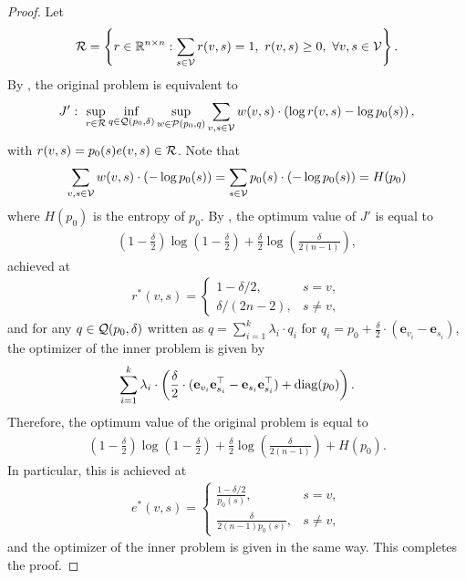 \begin{proof}
Let 
\begin{align*}
    \mathcal{R} = \left\{r \in \mathbb{R}^{n \times n}: \sum_{s \in \mathcal{V}} r(v,s) = 1, ~r(v,s) \geq 0,~ \forall v,s \in \mathcal{V} \right\}.
\end{align*}
By , the original problem is equivalent to
\begin{align*}
    J': ~\sup_{r \in \mathcal{R}} \inf_{q \in \mathcal{Q}(p_0,\delta)} \sup_{w \in \mathcal{P}(p_0,q)} \sum_{v,s \in \mathcal{V}} w(v,s) \cdot \left(\log r(v,s) - \log p_0(s)\right),
\end{align*}
with $r(v,s) = {p_0(s)e(v,s)} \in \mathcal{R}$.
Note that 
\begin{align*}
    \sum_{v,s \in \mathcal{V}} w(v,s) \cdot (- \log p_0(s)) = \sum_{s \in \mathcal{V}} p_0(s) \cdot (- \log p_0(s)) = H(p_0)
\end{align*}
where $H(p_0)$ is the entropy of $p_0$. 
By , the optimum value of $J'$ is equal to 
\begin{align*}
(1-\tfrac{\delta}{2})\log\left(1-\frac{\delta}{2}\right)
 + \tfrac{\delta}{2}\log\left(\frac{\delta}{2(n-1)}\right),
\end{align*}
achieved at
\begin{align*}
r^*(v,s)
=
\begin{cases}
1-\delta/2, & s=v,\\
\delta/(2n-2), & s\neq v,
\end{cases}
\end{align*}
and for any $q \in \mathcal{Q}(p_0,\delta)$ written as $q = \sum_{i=1}^k \lambda_i \cdot q_i$ for $q_i = p_0 + \frac{\delta}{2}\cdot (\mathbf{e}_{v_i} - \mathbf{e}_{s_i}) $, the optimizer of the inner problem is given by
\begin{align*}
    \sum_{i=1}^k \lambda_i \cdot \left(\frac{\delta}{2} \cdot (\mathbf{e}_{v_i}\mathbf{e}_{s_i}^\top - \mathbf{e}_{s_i}\mathbf{e}_{s_i}^\top) + \mathrm{diag}(p_0)\right).
\end{align*}
Therefore, the optimum value of the original problem is equal to
\begin{align*}
(1-\tfrac{\delta}{2})\log\left(1-\frac{\delta}{2}\right)
 + \tfrac{\delta}{2}\log\left(\frac{\delta}{2(n-1)}\right) + H(p_0).
\end{align*}
In particular, this is achieved at
\begin{align*}
e^*(v,s)
=
\begin{cases}
\frac{1-\delta/2}{p_0(s)}, & s=v,\\
\frac{\delta}{2(n-1)p_0(s)}, & s\neq v,
\end{cases}
\end{align*}
and the optimizer of the inner problem is given in the same way. 
This completes the proof.
\end{proof}


